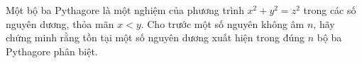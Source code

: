 \ifshowproblem
\begin{problem}\label{example:ROU-2015-TST-D1-P3}
    Một bộ ba Pythagore là một nghiệm của phương trình \( x^2 + y^2 = z^2 \) trong các số nguyên dương, thỏa mãn \( x < y \).
    Cho trước một số nguyên không âm \( n \), hãy chứng minh rằng tồn tại một số nguyên dương xuất hiện trong đúng \( n \) bộ ba Pythagore phân biệt.
\end{problem}
\fi

\footnotemark
{}
\fi